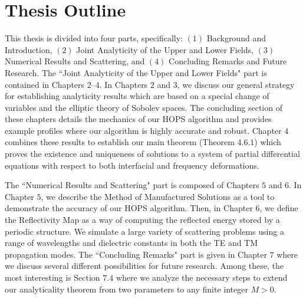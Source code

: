 \section{Thesis Outline}
\label{intro:thesis outline}

This thesis is divided into four parts, specifically: $(1)$ Background and Introduction, $(2)$ Joint Analyticity of the Upper and Lower Fields, $(3)$ Numerical Results and Scattering, and $(4)$ Concluding Remarks and Future Research. The ``Joint Analyticity of the Upper and Lower Fields" part is contained in Chapters $2$--$4$. In Chapters $2$ and $3$, we discuss our general strategy for establishing analyticity results which are based on a special change of variables and the elliptic theory of Sobolev spaces. The concluding section of these chapters details the mechanics of our HOPS algorithm and provides example profiles where our algorithm is highly accurate and robust. Chapter $4$ combines these results to establish our main theorem (Theorem $4.6.1$) which proves the existence and uniqueness of solutions to a system of partial differential equations with respect to both interfacial and frequency deformations.

The ``Numerical Results and Scattering" part is composed of Chapters $5$ and $6$. In Chapter $5$, we describe the Method of Manufactured Solutions as a tool to demonstrate the accuracy of our HOPS algorithm. Then, in Chapter 6, we define the Reflectivity Map as a way of computing the reflected energy stored by a periodic structure. We simulate a large variety of scattering problems using a range of wavelengths and dielectric constants in both the TE and TM propagation modes. The ``Concluding Remarks" part is given in Chapter $7$ where we discuss several different possibilities for future research. Among these, the most interesting is Section $7.4$ where we analyze the necessary steps to extend our analyticality theorem from two parameters to any finite integer $M>0$.